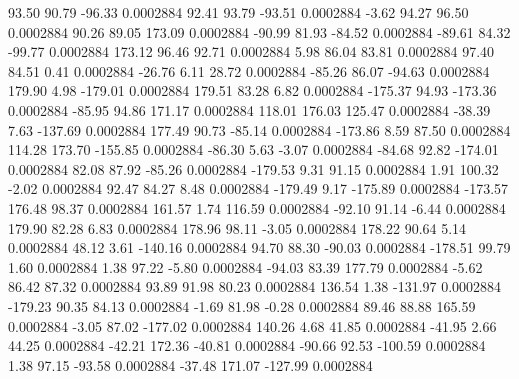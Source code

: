        93.50       90.79      -96.33     0.0002884
       92.41       93.79      -93.51     0.0002884
       -3.62       94.27       96.50     0.0002884
       90.26       89.05      173.09     0.0002884
      -90.99       81.93      -84.52     0.0002884
      -89.61       84.32      -99.77     0.0002884
      173.12       96.46       92.71     0.0002884
        5.98       86.04       83.81     0.0002884
       97.40       84.51        0.41     0.0002884
      -26.76        6.11       28.72     0.0002884
      -85.26       86.07      -94.63     0.0002884
      179.90        4.98     -179.01     0.0002884
      179.51       83.28        6.82     0.0002884
     -175.37       94.93     -173.36     0.0002884
      -85.95       94.86      171.17     0.0002884
      118.01      176.03      125.47     0.0002884
      -38.39        7.63     -137.69     0.0002884
      177.49       90.73      -85.14     0.0002884
     -173.86        8.59       87.50     0.0002884
      114.28      173.70     -155.85     0.0002884
      -86.30        5.63       -3.07     0.0002884
      -84.68       92.82     -174.01     0.0002884
       82.08       87.92      -85.26     0.0002884
     -179.53        9.31       91.15     0.0002884
        1.91      100.32       -2.02     0.0002884
       92.47       84.27        8.48     0.0002884
     -179.49        9.17     -175.89     0.0002884
     -173.57      176.48       98.37     0.0002884
      161.57        1.74      116.59     0.0002884
      -92.10       91.14       -6.44     0.0002884
      179.90       82.28        6.83     0.0002884
      178.96       98.11       -3.05     0.0002884
      178.22       90.64        5.14     0.0002884
       48.12        3.61     -140.16     0.0002884
       94.70       88.30      -90.03     0.0002884
     -178.51       99.79        1.60     0.0002884
        1.38       97.22       -5.80     0.0002884
      -94.03       83.39      177.79     0.0002884
       -5.62       86.42       87.32     0.0002884
       93.89       91.98       80.23     0.0002884
      136.54        1.38     -131.97     0.0002884
     -179.23       90.35       84.13     0.0002884
       -1.69       81.98       -0.28     0.0002884
       89.46       88.88      165.59     0.0002884
       -3.05       87.02     -177.02     0.0002884
      140.26        4.68       41.85     0.0002884
      -41.95        2.66       44.25     0.0002884
      -42.21      172.36      -40.81     0.0002884
      -90.66       92.53     -100.59     0.0002884
        1.38       97.15      -93.58     0.0002884
      -37.48      171.07     -127.99     0.0002884

